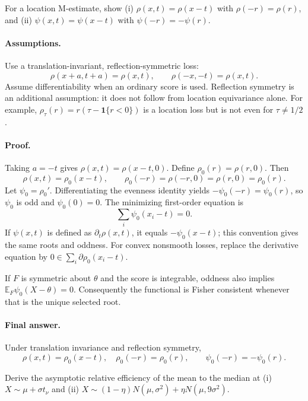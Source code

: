 \documentclass[answers,12pt,addpoints]{exam}
\providecommand{\E}{\mathbb{E}}
\providecommand{\ind}{\mathbf{1}}
\begin{document}
\begin{questions}
\question
For a location M-estimate, show (i) $\rho(x,t)=\rho(x-t)$ with
$\rho(-r)=\rho(r)$, and (ii) $\psi(x,t)=\psi(x-t)$ with
$\psi(-r)=-\psi(r)$.

\begin{solution}
\paragraph{Assumptions.}
Use a translation-invariant, reflection-symmetric loss:
\[
\rho(x+a,t+a)=\rho(x,t),\qquad \rho(-x,-t)=\rho(x,t).
\]
Assume differentiability when an ordinary score is used. Reflection
symmetry is an additional assumption: it does not follow from
location equivariance alone. For example,
$\rho_\tau(r)=r(\tau-\ind\{r<0\})$ is a location loss but is not
even for $\tau\ne1/2$.

\paragraph{Proof.}
Taking $a=-t$ gives $\rho(x,t)=\rho(x-t,0)$. Define
$\rho_0(r)=\rho(r,0)$. Then
\[
\rho(x,t)=\rho_0(x-t),\qquad
\rho_0(-r)=\rho(-r,0)=\rho(r,0)=\rho_0(r).
\]
Let $\psi_0=\rho_0'$. Differentiating the evenness identity yields
$-\psi_0(-r)=\psi_0(r)$, so $\psi_0$ is odd and $\psi_0(0)=0$.
The minimizing first-order equation is
\[
\sum_i\psi_0(x_i-t)=0.
\]
If $\psi(x,t)$ is defined as $\partial_t\rho(x,t)$, it equals
$-\psi_0(x-t)$; this convention gives the same roots and oddness.
For convex nonsmooth losses, replace the derivative equation by
$0\in\sum_i\partial\rho_0(x_i-t)$.

If $F$ is symmetric about $\theta$ and the score is integrable,
oddness also implies $\E_F\psi_0(X-\theta)=0$. Consequently the
functional is Fisher consistent whenever that is the unique selected
root.

\paragraph{Final answer.}
Under translation invariance and reflection symmetry,
\[
\boxed{\rho(x,t)=\rho_0(x-t),\quad \rho_0(-r)=\rho_0(r),
\qquad \psi_0(-r)=-\psi_0(r).}
\]
\end{solution}

\question
Derive the asymptotic relative efficiency of the mean to the median
at (i) $X\sim\mu+\sigma t_\nu$ and (ii)
$X\sim(1-\eta)N(\mu,\sigma^2)+\eta N(\mu,9\sigma^2)$.


\end{questions}
\end{document}
